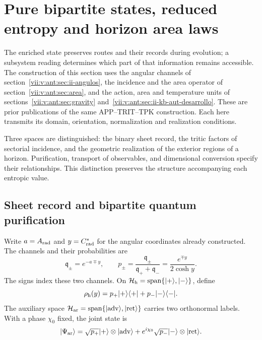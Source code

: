 
\section{Pure bipartite states, reduced entropy and horizon area laws}
\label{vii:vii:sec:horizontes-informacion}

The enriched state preserves routes and their records during
evolution; a subsystem reading determines which part of that information
remains accessible. The construction of this section uses the angular
channels of section~\ref{vii:v:ant:sec:ii-angulos}, the incidence and the
area operator of section~\ref{vii:v:ant:sec:area}, and the action,
area and temperature units of
sections~\ref{vii:v:ant:sec:gravity}
and~\ref{vii:v:ant:sec:ii-kb-aut-desarrollo}. These are prior publications of the
same APP--TRIT--TPK construction. Each here transmits its domain,
orientation, normalization and realization conditions.

Three spaces are distinguished: the binary sheet record, the tritic
factors of sectorial incidence, and the geometric realization of the
exterior regions of a horizon. Purification, transport of observables,
and dimensional conversion specify their relationships. This
distinction preserves the structure accompanying each entropic value.

\subsection{Sheet record and bipartite quantum purification}
\label{vii:vii:subsec:hojas-purificacion}

Write \(a=A_{\rm rad}\) and \(y=C^*_{\rm rad}\) for the
angular coordinates already constructed. The channels and their probabilities are
\begin{equation}
 \mathfrak q_\pm=e^{-a\mp y},\qquad
 p_\pm=\frac{\mathfrak q_\pm}{\mathfrak q_++\mathfrak q_-}
       =\frac{e^{\mp y}}{2\cosh y}.
 \label{vii:vii:eq:probabilidades-hoja}
\end{equation}
The signs index these two channels. On
\(\mathcal H_{\rm h}=\operatorname{span}\{|+\rangle,|-\rangle\}\),
define
\[
 \rho_{\rm h}(y)=p_+|+\rangle\langle+|+p_-|-\rangle\langle-|.
\]
The auxiliary space
\(\mathcal H_{\rm ar}=\operatorname{span}
\{|\mathrm{adv}\rangle,|\mathrm{ret}\rangle\}\)
carries two orthonormal labels. With a phase \(\chi_0\) fixed, the joint
state is
\begin{equation}
 |\Psi_{\rm ar}\rangle
 =\sqrt{p_+}|+\rangle\otimes|\mathrm{adv}\rangle
  +e^{i\chi_0}\sqrt{p_-}|-\rangle\otimes|\mathrm{ret}\rangle.
 \label{vii:vii:eq:purificacion-hoja}
\end{equation}

